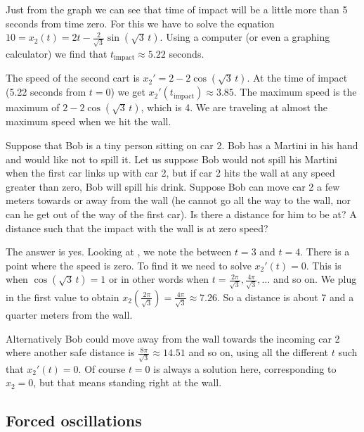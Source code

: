 \documentclass[12pt]{book}
\begin{document}
\begin{example}
Just from the graph we can see that time of impact will be a little
more than 5 seconds from time zero.  For this we have to solve
the equation $10 = x_2(t) = 2 t - \frac{2}{\sqrt{3}} \sin (\! \sqrt{3} \,
t)$.
Using a computer (or even a graphing calculator)
we find that $t_{\text{impact}} \approx 5.22$ seconds.

The speed of the second cart is $x_2' = 2 - 2 \cos (\! \sqrt{3} \, t)$.
At the time of impact (5.22 seconds from $t=0$) we get 
$x_2'(t_{\text{impact}}) \approx 3.85$.
%
The maximum speed is the maximum of $2 - 2 \cos (\! \sqrt{3} \, t )$, which is 4.
We are traveling at almost the maximum speed when we hit the wall.

\medskip

Suppose that Bob is a tiny person sitting on car 2.  Bob has a Martini in
his hand and would like not to spill it.  Let us suppose Bob would not spill
his Martini
when the first car links up with car 2, but if car 2 hits the wall at any
speed greater than zero, Bob will spill his drink.  Suppose Bob
can move car 2
a few meters towards or away from the wall (he cannot go all the way to the
wall, nor can he get out of the way of the first car).  Is there a
distance for him to be at?  A distance such that the impact with
the wall is at zero speed?

The answer is yes.  Looking at ,
we note the  between $t=3$ and $t=4$.  There is a point where
the speed is zero.  To find it we need to solve $x_2'(t) = 0$.  This is when
$\cos (\! \sqrt{3} \, t) = 1$ or in other words when $t = \frac{2 \pi}{\sqrt{3}}, 
\frac{4 \pi}{\sqrt{3}},\ldots$ and so on.  We plug in the first value to obtain
$x_2\left(\frac{2 \pi}{\sqrt{3}}\right) = 
\frac{4 \pi}{\sqrt{3}} \approx 7.26$.  So a  distance is about 7 and a
quarter meters from the wall.

Alternatively Bob could move away from the wall
towards the incoming car 2 where another safe distance is
$\frac{8 \pi}{\sqrt{3}} \approx 14.51$ and so on, using all the different
$t$ such that $x_2'(t) = 0$.  Of course $t=0$ is always a solution here,
corresponding to $x_2 = 0$, but
that means standing right at the wall.
\end{example}

\subsection{Forced oscillations}
\end{document}
